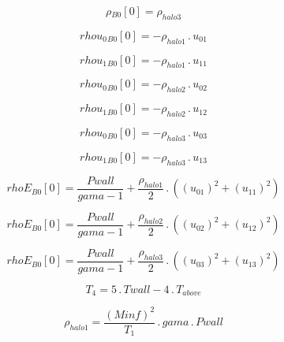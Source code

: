 \documentclass{article}
\begin{document}
\begin{dmath}{\rho{_{B0}}}[{0}] = \rho_{halo 3}\end{dmath}

\begin{dmath}{rhou_{0}{_{B0}}}[{0}] = - \rho_{halo 1} \,.\, u_{01}\end{dmath}

\begin{dmath}{rhou_{1}{_{B0}}}[{0}] = - \rho_{halo 1} \,.\, u_{11}\end{dmath}

\begin{dmath}{rhou_{0}{_{B0}}}[{0}] = - \rho_{halo 2} \,.\, u_{02}\end{dmath}

\begin{dmath}{rhou_{1}{_{B0}}}[{0}] = - \rho_{halo 2} \,.\, u_{12}\end{dmath}

\begin{dmath}{rhou_{0}{_{B0}}}[{0}] = - \rho_{halo 3} \,.\, u_{03}\end{dmath}

\begin{dmath}{rhou_{1}{_{B0}}}[{0}] = - \rho_{halo 3} \,.\, u_{13}\end{dmath}

\begin{dmath}{rhoE{_{B0}}}[{0}] = \frac{Pwall}{gama - 1} + \frac{\rho_{halo 1}}{2} \,.\, \left(\left(u_{01} \right)^{2} + \left(u_{11} \right)^{2}\right)\end{dmath}

\begin{dmath}{rhoE{_{B0}}}[{0}] = \frac{Pwall}{gama - 1} + \frac{\rho_{halo 2}}{2} \,.\, \left(\left(u_{02} \right)^{2} + \left(u_{12} \right)^{2}\right)\end{dmath}

\begin{dmath}{rhoE{_{B0}}}[{0}] = \frac{Pwall}{gama - 1} + \frac{\rho_{halo 3}}{2} \,.\, \left(\left(u_{03} \right)^{2} + \left(u_{13} \right)^{2}\right)\end{dmath}

\begin{dmath}T_{4} = 5 \,.\, Twall - 4 \,.\, T_{above}\end{dmath}

\begin{dmath}\rho_{halo 1} = \frac{\left(Minf \right)^{2}}{T_{1}} \,.\, gama \,.\, Pwall\end{dmath}
\end{document}
